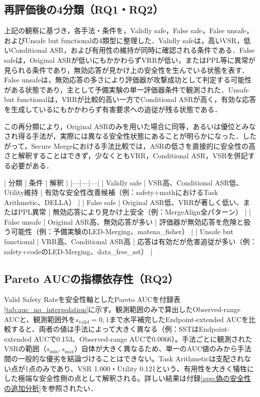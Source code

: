 \documentclass{article}
\begin{document}
\subsection{再評価後の4分類（RQ1・RQ2）}
上記の観察に基づき，各手法・条件を，Validly safe，False safe，False unsafe，およびUnsafe but functionalの4類型に整理した．Validly safeは，高いVSR，低いConditional ASR，および有用性の維持が同時に確認される条件である．False safeは，Original ASRが低いにもかかわらずVRRが低い，またはPPL等に異常が見られる条件であり，無効応答が見かけ上の安全性を生んでいる状態を表す．False unsafeは，無効応答の多さにより評価器が攻撃成功として判定する可能性がある状態であり，主として予備実験の単一評価器条件で観測された．Unsafe but functionalは，VRRが比較的高い一方でConditional ASRが高く，有効な応答を生成しているにもかかわらず有害要求への追従が残る状態である．

この再分類により，Original ASRのみを用いた場合に同等，あるいは優位とみなされ得る手法が，実際には異なる安全性状態にあることが明らかになった．したがって，Secure Mergeにおける手法比較では，ASRの低さを直接的に安全性の高さと解釈することはできず，少なくともVRR，Conditional ASR，VSRを併記する必要がある．

| 分類 | 条件 | 解釈 |
|---|---|---|
| Validly safe | VSR高、Conditional ASR低、Utility維持 | 有効な安全性改善候補（例：safety+mathにおけるTask Arithmetic、DELLA） |
| False safe | Original ASR低、VRRが著しく低い、またはPPL異常 | 無効応答により見かけ上安全（例：MergeAlign全パターン） |
| False unsafe | Original ASR高、無効応答が多い | 評価器が無効応答を危険と扱う可能性（例：予備実験のLED-Merging、matena\_fisher） |
| Unsafe but functional | VRR高、Conditional ASR高 | 応答は有効だが危害追従が多い（例：safety+codeのLED-Merging、data\_free\_sst） |

\subsection{Pareto AUCの指標依存性（RQ2）}

Valid Safety Rateを安全性軸としたPareto AUCを付録表\ref{tab:auc_no_interpolation}に示す。観測範囲のみで算出したObserved-range AUCと、観測範囲外を\(s_{\text{valid}}=0,1\)まで水平補完したEndpoint-extended AUCを比較すると、両者の値は手法によって大きく異なる（例：SSTはEndpoint-extended AUCで0.153、Observed-range AUCで0.0066）。手法ごとに観測されたVSRの範囲（\(s_{\min}, s_{\max}\)）自体が大きく異なるため、単一のAUC値のみから手法間の一般的な優劣を結論づけることはできない。Task Arithmeticは支配されない点が1点のみであり、VSR 1.000・Utility 0.121という、有用性を大きく犠牲にした極端な安全性側の点として解釈される。詳しい結果は付録\ref{app:偽の安全性の追加分析}を参照されたい．
\end{document}
